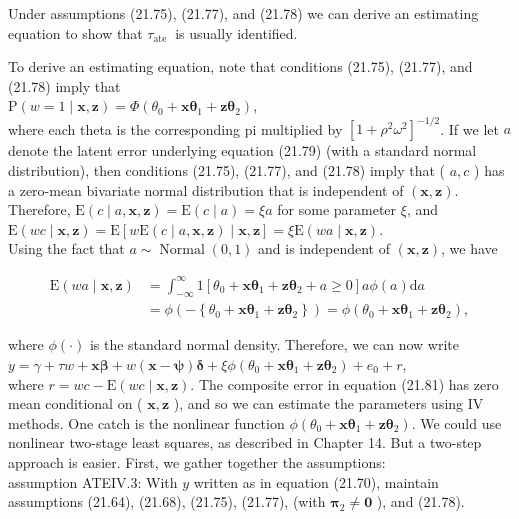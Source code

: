 \documentclass[10pt]{article}
\begin{document}
Under assumptions (21.75), (21.77), and (21.78) we can derive an estimating equation to show that $\tau_{\text {ate }}$ is usually identified.

To derive an estimating equation, note that conditions (21.75), (21.77), and (21.78) imply that\\
$\mathrm{P}(w=1 \mid \mathbf{x}, \mathbf{z})=\Phi\left(\theta_{0}+\mathbf{x} \boldsymbol{\theta}_{1}+\mathbf{z} \boldsymbol{\theta}_{2}\right)$,\\
where each theta is the corresponding pi multiplied by $\left[1+\rho^{2} \omega^{2}\right]^{-1 / 2}$. If we let $a$ denote the latent error underlying equation (21.79) (with a standard normal distribution), then conditions (21.75), (21.77), and (21.78) imply that ( $a, c$ ) has a zero-mean bivariate normal distribution that is independent of $(\mathbf{x}, \mathbf{z})$. Therefore, $\mathrm{E}(c \mid a, \mathbf{x}, \mathbf{z})= \mathrm{E}(c \mid a)=\xi a$ for some parameter $\xi$, and\\
$\mathrm{E}(w c \mid \mathbf{x}, \mathbf{z})=\mathrm{E}[w \mathrm{E}(c \mid a, \mathbf{x}, \mathbf{z}) \mid \mathbf{x}, \mathbf{z}]=\xi \mathrm{E}(w a \mid \mathbf{x}, \mathbf{z})$.\\
Using the fact that $a \sim \operatorname{Normal}(0,1)$ and is independent of $(\mathbf{x}, \mathbf{z})$, we have


\begin{align*}
\mathrm{E}(w a \mid \mathbf{x}, \mathbf{z}) & =\int_{-\infty}^{\infty} 1\left[\theta_{0}+\mathbf{x} \boldsymbol{\theta}_{1}+\mathbf{z} \boldsymbol{\theta}_{2}+a \geq 0\right] a \phi(a) \mathrm{d} a \\
& =\phi\left(-\left\{\theta_{0}+\mathbf{x} \boldsymbol{\theta}_{1}+\mathbf{z} \boldsymbol{\theta}_{2}\right\}\right)=\phi\left(\theta_{0}+\mathbf{x} \boldsymbol{\theta}_{1}+\mathbf{z} \boldsymbol{\theta}_{2}\right), \tag{21.80}
\end{align*}


where $\phi(\cdot)$ is the standard normal density. Therefore, we can now write\\
$y=\gamma+\tau w+\mathbf{x} \boldsymbol{\beta}+w(\mathbf{x}-\boldsymbol{\psi}) \boldsymbol{\delta}+\xi \phi\left(\theta_{0}+\mathbf{x} \boldsymbol{\theta}_{1}+\mathbf{z} \boldsymbol{\theta}_{2}\right)+e_{0}+r$,\\
where $r=w c-\mathrm{E}(w c \mid \mathbf{x}, \mathbf{z})$. The composite error in equation (21.81) has zero mean conditional on ( $\mathbf{x}, \mathbf{z}$ ), and so we can estimate the parameters using IV methods. One catch is the nonlinear function $\phi\left(\theta_{0}+\mathbf{x} \boldsymbol{\theta}_{1}+\mathbf{z} \boldsymbol{\theta}_{2}\right)$. We could use nonlinear two-stage least squares, as described in Chapter 14. But a two-step approach is easier. First, we gather together the assumptions:\\
assumption ATEIV.3: With $y$ written as in equation (21.70), maintain assumptions (21.64), (21.68), (21.75), (21.77), (with $\boldsymbol{\pi}_{2} \neq \mathbf{0}$ ), and (21.78).
\end{document}

